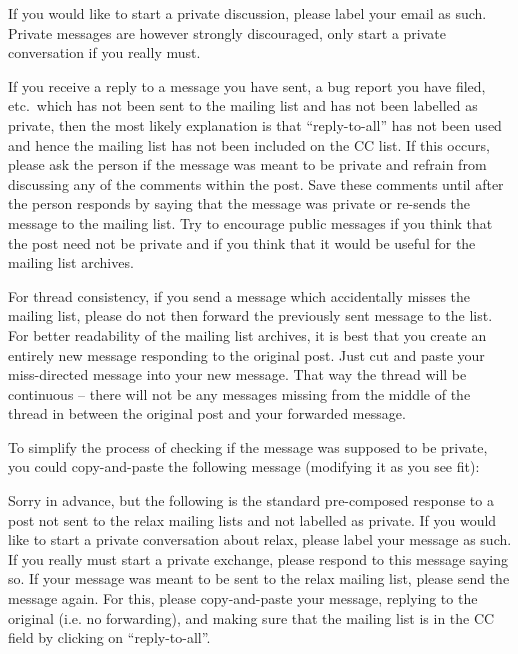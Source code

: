 If you would like to start a private discussion, please label your email as such.
Private messages are however strongly discouraged, only start a private conversation if you really must.

If you receive a reply to a message you have sent, a bug report you have filed, etc.\ which has not been sent to the mailing list and has not been labelled as private, then the most likely explanation is that ``reply-to-all'' has not been used and hence the mailing list has not been included on the CC list.
If this occurs, please ask the person if the message was meant to be private and refrain from discussing any of the comments within the post.
Save these comments until after the person responds by saying that the message was private or re-sends the message to the mailing list.
Try to encourage public messages if you think that the post need not be private and if you think that it would be useful for the mailing list archives.

For thread consistency, if you send a message which accidentally misses the mailing list, please do not then forward the previously sent message to the list.
For better readability of the mailing list archives, it is best that you create an entirely new message responding to the original post.
Just cut and paste your miss-directed message into your new message.
That way the thread will be continuous -- there will not be any messages missing from the middle of the thread in between the original post and your forwarded message.

To simplify the process of checking if the message was supposed to be private, you could copy-and-paste the following message (modifying it as you see fit):

\begin{exampleenv}
Sorry in advance, but the following is the standard pre-composed response to a post not sent to the relax mailing lists and not labelled as private.  If you would like to start a private conversation about relax, please label your message as such.  If you really must start a private exchange, please respond to this message saying so.  If your message was meant to be sent to the relax mailing list, please send the message again.  For this, please copy-and-paste your message, replying to the original (i.e. no forwarding), and making sure that the mailing list is in the CC field by clicking on ``reply-to-all''.
\end{exampleenv}





